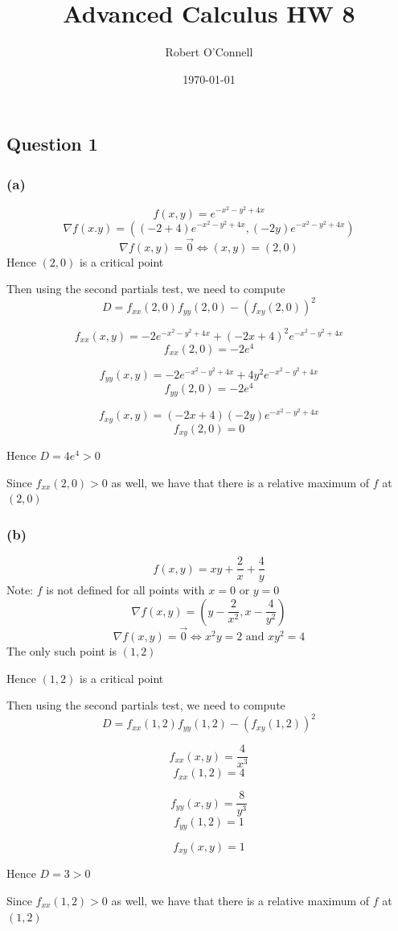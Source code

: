 \documentclass{article}
\title{\textbf{Advanced Calculus HW 8}}
\author{Robert O'Connell}
\date{\today}
\begin{document}
\maketitle
\vspace{5mm}
\subsection*{Question 1}
\subsubsection*{(a)}
\[
f(x,y) = e^{-x^2 - y^2 + 4x}
\]
\[
\nabla f(x.y) = ((-2+4)e^{-x^2 - y^2 + 4x}, (-2y)e^{-x^2 - y^2 + 4x})
\]
\[
\nabla f(x,y) = \vec{0} \iff (x,y) = (2,0)
\]
Hence \((2,0)\) is a critical point

Then using the second partials test, we need to compute
\[
D = f_{xx}(2,0) f_{yy}(2,0) - (f_{xy}(2,0))^2
\]

\[
f_{xx}(x,y) = -2e^{-x^2 - y^2 + 4x} + (-2x + 4)^2e^{-x^2 - y^2 + 4x}
\]
\[
f_{xx}(2,0) = -2e^4
\]

\[
f_{yy}(x,y) = -2e^{-x^2 - y^2 + 4x} + 4y^2e^{-x^2 - y^2 + 4x}
\]
\[
f_{yy}(2,0) = -2e^4
\]

\[
f_{xy}(x,y) = (-2x+4)(-2y)e^{-x^2 - y^2 + 4x}
\]
\[
f_{xy}(2,0) = 0
\]

Hence \(D = 4e^4 >0\)

Since \(f_{xx}(2,0)>0\) as well, we have that there is a relative maximum of \(f\) at \((2,0)\) 
\subsubsection*{(b)}
\[
f(x,y) = xy + \frac{2}{x} + \frac{4}{y}
\]
Note: \(f\) is not defined for all points with \(x=0\) or \(y=0\)
\[
\nabla f(x,y) = (y- \frac{2}{x^2}, x - \frac{4}{y^2})
\]
\[
\nabla f(x,y) = \vec{0} \iff x^2y =2 \text{ and } xy^2 = 4
\]
The only such point is \((1,2)\)

Hence \((1,2)\) is a critical point

Then using the second partials test, we need to compute
\[
D = f_{xx}(1,2) f_{yy}(1,2) - (f_{xy}(1,2))^2
\]

\[
f_{xx}(x,y) = \frac{4}{x^3}
\]
\[
f_{xx}(1,2) = 4
\]

\[
f_{yy}(x,y) = \frac{8}{y^3}
\]
\[
f_{yy}(1,2) = 1
\]

\[
f_{xy}(x,y) = 1
\]

Hence \(D = 3>0 \) 

Since \(f_{xx}(1,2)>0\) as well, we have that there is a relative maximum of \(f\) at \((1,2)\) 
\end{document}
